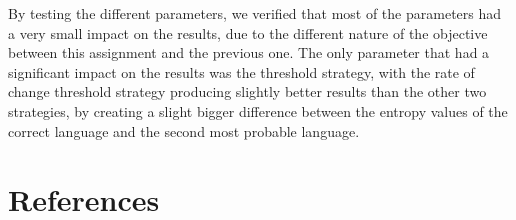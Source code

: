 \documentclass{article}
\begin{document}
By testing the different parameters, we verified that most of the parameters had a very small impact on the results, due to the different nature of the objective between this
assignment and the previous one. The only parameter that had a significant impact on the results was the threshold strategy, with the rate of change threshold strategy producing
slightly better results than the other two strategies, by creating a slight bigger difference between the entropy values of the correct language and the second most probable language.

\section{References}


\end{document}
